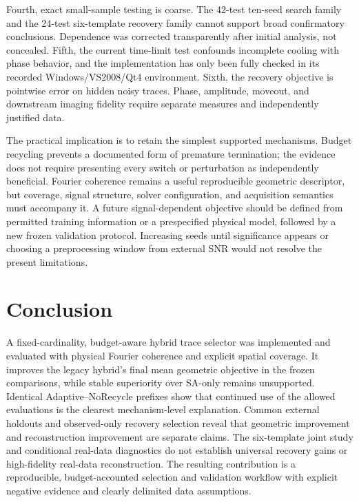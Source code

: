 \documentclass[journal]{IEEEtran}
\begin{document}
Fourth, exact small-sample testing is coarse. The 42-test ten-seed search family and the 24-test six-template recovery family cannot support broad confirmatory conclusions. Dependence was corrected transparently after initial analysis, not concealed. Fifth, the current time-limit test confounds incomplete cooling with phase behavior, and the implementation has only been fully checked in its recorded Windows/VS2008/Qt4 environment. Sixth, the recovery objective is pointwise error on hidden noisy traces. Phase, amplitude, moveout, and downstream imaging fidelity require separate measures and independently justified data.

The practical implication is to retain the simplest supported mechanisms. Budget recycling prevents a documented form of premature termination; the evidence does not require presenting every switch or perturbation as independently beneficial. Fourier coherence remains a useful reproducible geometric descriptor, but coverage, signal structure, solver configuration, and acquisition semantics must accompany it. A future signal-dependent objective should be defined from permitted training information or a prespecified physical model, followed by a new frozen validation protocol. Increasing seeds until significance appears or choosing a preprocessing window from external SNR would not resolve the present limitations.

\balance
\section{Conclusion}
A fixed-cardinality, budget-aware hybrid trace selector was implemented and evaluated with physical Fourier coherence and explicit spatial coverage. It improves the legacy hybrid's final mean geometric objective in the frozen comparisons, while stable superiority over SA-only remains unsupported. Identical Adaptive--NoRecycle prefixes show that continued use of the allowed evaluations is the clearest mechanism-level explanation. Common external holdouts and observed-only recovery selection reveal that geometric improvement and reconstruction improvement are separate claims. The six-template joint study and conditional real-data diagnostics do not establish universal recovery gains or high-fidelity real-data reconstruction. The resulting contribution is a reproducible, budget-accounted selection and validation workflow with explicit negative evidence and clearly delimited data assumptions.
\end{document}
